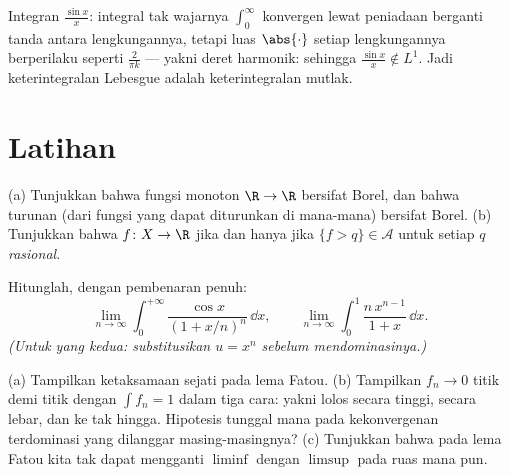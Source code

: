 \begin{omfigure}

{\small Integran $\frac{\sin x}x$: integral tak wajarnya
$\int_0^\infty$ konvergen lewat peniadaan berganti tanda antara
lengkungannya, tetapi luas $\abs{\cdot}$ setiap lengkungannya berperilaku
seperti $\frac2{\pi k}$ --- yakni deret harmonik: sehingga $\frac{\sin x}x
\notin L^1$. Jadi keterintegralan Lebesgue adalah keterintegralan mutlak.}
\end{omfigure}

\section{Latihan}

\begin{exercise}[$\star$]\label{exo:b3:lebesgue:1}
(a) Tunjukkan bahwa fungsi monoton $\R \to \R$ bersifat
 Borel, dan bahwa turunan (dari fungsi yang dapat diturunkan
di mana-mana) bersifat  Borel.
(b) Tunjukkan bahwa $f \colon X \to \R$  jika dan hanya jika $\{f > q\}
\in \mathcal A$ untuk setiap $q$ \emph{rasional}.
\end{exercise}

\begin{exercise}[$\star$]\label{exo:b3:lebesgue:2}
Hitunglah, dengan pembenaran penuh:
\[
\lim_{n\to\infty}\int_0^{+\infty}
\frac{\cos x}{(1 + x/n)^{n}}\,\dd x,
\qquad
\lim_{n\to\infty}\int_0^1 \frac{n\,x^{n-1}}{1 + x}\,\dd x .
\]
\emph{(Untuk yang kedua: substitusikan $u = x^n$ sebelum mendominasinya.)}
\end{exercise}

\begin{exercise}[$\star\star$]\label{exo:b3:lebesgue:3}
(a) Tampilkan ketaksamaan sejati pada lema Fatou.
(b) Tampilkan $f_n \to 0$ titik demi titik dengan $\int f_n = 1$ dalam tiga
cara: yakni lolos secara tinggi, secara lebar, dan ke tak hingga. Hipotesis
tunggal mana pada kekonvergenan terdominasi yang dilanggar masing-masingnya?
(c) Tunjukkan bahwa pada lema Fatou kita tak dapat mengganti $\liminf$ dengan
$\limsup$ pada ruas mana pun.
\end{exercise}

